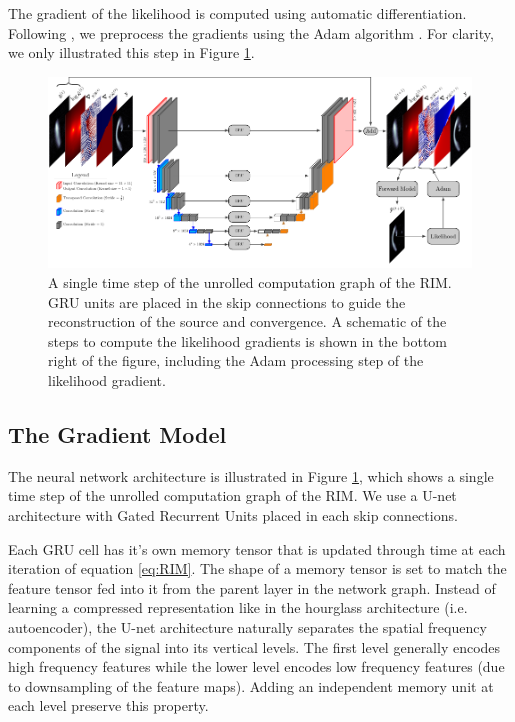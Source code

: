 The gradient of the likelihood is computed using automatic differentiation. Following 
\citep{Modi2021}, we preprocess the gradients using the Adam algorithm \citep{Kingma2013}. 
For clarity, we only illustrated this step in Figure \ref{fig:unet}. 

\begin{figure}[ht!]
        \centering
        \includegraphics[width=\textwidth]{figures/unet_architecture.pdf}
        \caption{
A single time step of the unrolled computation graph of the RIM.
GRU units are placed in the skip connections to guide the 
reconstruction of the source and convergence. A schematic of the steps to compute 
the likelihood gradients is shown in the bottom right of the figure, including the 
Adam processing step of the likelihood gradient.}
        \label{fig:unet}
\end{figure}

\subsection{The Gradient Model}\label{sec:gradient model}


The neural network architecture is illustrated in Figure \ref{fig:unet}, which shows 
a single time step of the unrolled computation graph of the RIM.
We use a U-net \citep{Ronneberger2015} architecture 
with Gated Recurrent Units \citep[GRU:][]{Cho2014} placed in each skip connections. 

Each GRU cell has it's own memory tensor that is updated through time at each iteration of 
equation \ref{eq:RIM}. The shape of a memory tensor is set to match the
feature tensor fed into it from the parent layer in the network graph. 
Instead of learning a compressed representation like in the hourglass
architecture (i.e. autoencoder), the U-net architecture naturally separates the spatial 
frequency components of the signal into its vertical levels. The first level generally encodes 
high frequency features while the lower level encodes low frequency features (due to downsampling of the feature maps). 
Adding an independent memory unit 
at each level preserve this property.

